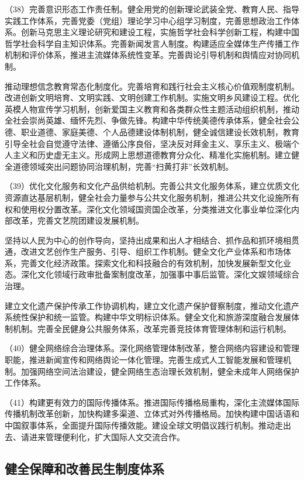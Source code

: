     （38）完善意识形态工作责任制。健全用党的创新理论武装全党、教育人民、指导实践工作体系，完善党委（党组）理论学习中心组学习制度，完善思想政治工作体系。创新马克思主义理论研究和建设工程，实施哲学社会科学创新工程，构建中国哲学社会科学自主知识体系。完善新闻发言人制度。构建适应全媒体生产传播工作机制和评价体系，推进主流媒体系统性变革。完善舆论引导机制和舆情应对协同机制。

    推动理想信念教育常态化制度化。完善培育和践行社会主义核心价值观制度机制。改进创新文明培育、文明实践、文明创建工作机制。实施文明乡风建设工程。优化英模人物宣传学习机制，创新爱国主义教育和各类群众性主题活动组织机制，推动全社会崇尚英雄、缅怀先烈、争做先锋。构建中华传统美德传承体系，健全社会公德、职业道德、家庭美德、个人品德建设体制机制，健全诚信建设长效机制，教育引导全社会自觉遵守法律、遵循公序良俗，坚决反对拜金主义、享乐主义、极端个人主义和历史虚无主义。形成网上思想道德教育分众化、精准化实施机制。建立健全道德领域突出问题协同治理机制，完善“扫黄打非”长效机制。

    （39）优化文化服务和文化产品供给机制。完善公共文化服务体系，建立优质文化资源直达基层机制，健全社会力量参与公共文化服务机制，推进公共文化设施所有权和使用权分置改革。深化文化领域国资国企改革，分类推进文化事业单位深化内部改革，完善文艺院团建设发展机制。

    坚持以人民为中心的创作导向，坚持出成果和出人才相结合、抓作品和抓环境相贯通，改进文艺创作生产服务、引导、组织工作机制。健全文化产业体系和市场体系，完善文化经济政策。探索文化和科技融合的有效机制，加快发展新型文化业态。深化文化领域行政审批备案制度改革，加强事中事后监管。深化文娱领域综合治理。

    建立文化遗产保护传承工作协调机构，建立文化遗产保护督察制度，推动文化遗产系统性保护和统一监管。构建中华文明标识体系。健全文化和旅游深度融合发展体制机制。完善全民健身公共服务体系，改革完善竞技体育管理体制和运行机制。

    （40）健全网络综合治理体系。深化网络管理体制改革，整合网络内容建设和管理职能，推进新闻宣传和网络舆论一体化管理。完善生成式人工智能发展和管理机制。加强网络空间法治建设，健全网络生态治理长效机制，健全未成年人网络保护工作体系。

    （41）构建更有效力的国际传播体系。推进国际传播格局重构，深化主流媒体国际传播机制改革创新，加快构建多渠道、立体式对外传播格局。加快构建中国话语和中国叙事体系，全面提升国际传播效能。建设全球文明倡议践行机制。推动走出去、请进来管理便利化，扩大国际人文交流合作。

    \subsection{健全保障和改善民生制度体系}

